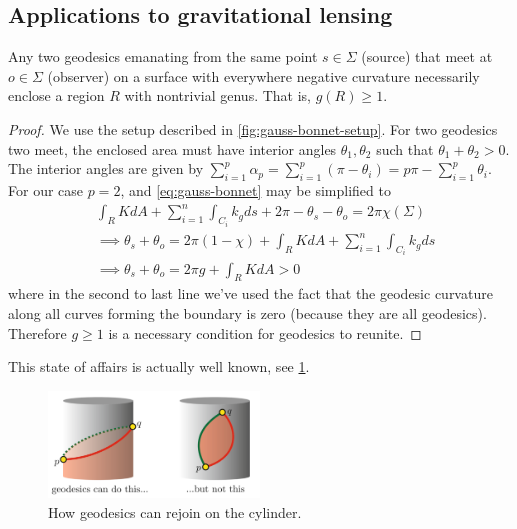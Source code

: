 \subsection{Applications to gravitational lensing}
\begin{theorem}[]\label{thm:nontrivial-topology}
Any two geodesics emanating from the same point $s \in \Sigma$ (source) that meet at $o \in \Sigma$ (observer) on a surface with everywhere negative curvature necessarily enclose a region $R$ with nontrivial genus. That is, $g(R) \ge 1$.
\end{theorem}
\begin{proof}
We use the setup described in \cref{fig:gauss-bonnet-setup}. For two geodesics two meet, the enclosed area must have interior angles $\theta_1, \theta_2$ such that $\theta_1 + \theta_2 > 0$. The interior angles are given by $\sum_{i=1}^p \alpha_p = \sum_{i=1}^p(\pi-\theta_i) = p \pi - \sum_{i=1}^p \theta_i$. For our case $p=2$, and \cref{eq:gauss-bonnet} may be simplified to
\begin{align*}
&\int_R K dA + \sum_{i=1}^n \int_{C_i} k_g ds + 2 \pi - \theta_s - \theta_o = 2 \pi \chi(\Sigma) \\
&\implies \theta_s + \theta_o = 2 \pi (1 - \chi) + \int_R K dA + \sum_{i=1}^n \int_{C_i} k_g ds \\
&\implies \theta_s + \theta_o = 2 \pi g + \int_R K dA > 0
\end{align*}
where in the second to last line we've used the fact that the geodesic curvature along all curves forming the boundary is zero (because they are all geodesics).
Therefore $g \ge 1$ is a necessary condition for geodesics to reunite.
\end{proof}
This state of affairs is actually well known, see \cref{fig:geodesics-cylinder}.
\begin{figure}[!htb]
	\centering
	\includegraphics[width=0.5\textwidth]{img/geodesics-on-cylinder.png}
	\caption{How geodesics can rejoin on the cylinder.}
	\label{fig:geodesics-cylinder}
\end{figure}
